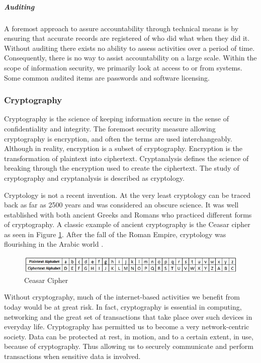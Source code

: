 \subparagraph{Auditing}
A foremost approach to assure accountability through technical means is by ensuring that accurate records are registered of who did what when they did it. Without auditing there exists no ability to assess activities over a period of time. Consequently, there is no way to assist accountability on a large scale. Within the scope of information security, we primarily look at access to or from systems. Some common audited items are passwords and software licensing.

\subsubsection{Cryptography}
Cryptography is the science of keeping information secure in the sense of confidentiality and integrity. The foremost security measure allowing cryptography is encryption, and often the terms are used interchangeably. Although in reality, encryption is a subset of cryptography. Encryption is the transformation of plaintext into ciphertext. Cryptanalysis defines the science of breaking through the encryption used to create the ciphertext. The study of cryptography and cryptanalysis is described as cryptology.

Cryptology is not a recent invention. At the very least cryptology can be traced back as far as 2500 years and was considered an obscure science. It was well established with both ancient Greeks and Romans who practiced different forms of cryptography. A classic example of ancient cryptography is the Ceasar cipher as seen in Figure \ref{fig:ceasar-cipher}. After the fall of the Roman Empire, cryptology was flourishing in the Arabic world \cite{dooley2018history}.

\begin{figure}[!h]
    \includegraphics[width=\textwidth]{../../img/chapter_2/ceasar-cipher.jpg}
    \caption{Ceasar Cipher}\label{fig:ceasar-cipher}
\end{figure}

Without cryptography, much of the internet-based activities we benefit from today would be at great risk. In fact, cryptography is essential in computing, networking and the great set of transactions that take place over such devices in everyday life. Cryptography has permitted us to become a very network-centric society. 
Data can be protected at rest, in motion, and to a certain extent, in use, because of cryptography. Thus allowing us to securely communicate and perform transactions when sensitive data is involved.

